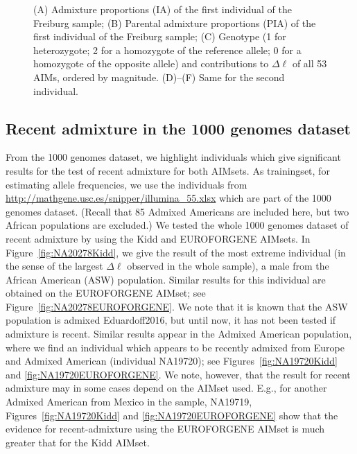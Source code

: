 \documentclass[12pt]{article}
\theoremstyle{definition}
\begin{document}
\begin{figure}[htb]
    
  \caption{\label{fig:ind83} (A) Admixture proportions (IA) of the
    first individual of the Freiburg sample; (B) Parental admixture
    proportions (PIA) of the first individual of the Freiburg sample;
    (C) Genotype (1 for heterozygote; 2 for a homozygote of the
    reference allele; 0 for a homozygote of the opposite allele) and
    contributions to $\Delta\ell$ of all 53 AIMs, ordered by
    magnitude. (D)--(F) Same for the second individual. }
\end{figure}


\subsection{Recent admixture in the 1000 genomes dataset}
From the 1000 genomes dataset, we highlight individuals which give
significant results for the test of recent admixture for both
AIMsets. As trainingset, for estimating allele frequencies, we use the
individuals from \url{http://mathgene.usc.es/snipper/illumina_55.xlsx}
which are part of the 1000 genomes dataset. (Recall that 85 Admixed
Americans are included here, but two African populations are
excluded.) We tested the whole 1000 genomes dataset of recent
admixture by using the Kidd and EUROFORGENE AIMsets. In
Figure~\ref{fig:NA20278Kidd}, we give the result of the most extreme
individual (in the sense of the largest $\Delta\ell$ observed in the
whole sample), a male from the African American (ASW)
population. Similar results for this individual are obtained on the
EUROFORGENE AIMset; see Figure~\ref{fig:NA20278EUROFORGENE}. We note
that it is known that the ASW population is admixed
\cite{article}{Eduardoff2016}, but until now, it has not been tested
if admixture is recent. Similar results appear in the Admixed American
population, where we find an individual which appears to be recently
admixed from Europe and Admixed American (individual NA19720); see
Figures~\ref{fig:NA19720Kidd} and \ref{fig:NA19720EUROFORGENE}.  We
note, however, that the result for recent admixture may in some cases
depend on the AIMset used. E.g., for another Admixed American from
Mexico in the sample, NA19719, Figures~\ref{fig:NA19720Kidd} and
\ref{fig:NA19720EUROFORGENE} show that the evidence for
recent-admixture using the EUROFORGENE AIMset is much greater that for
the Kidd AIMset.
\end{document}
